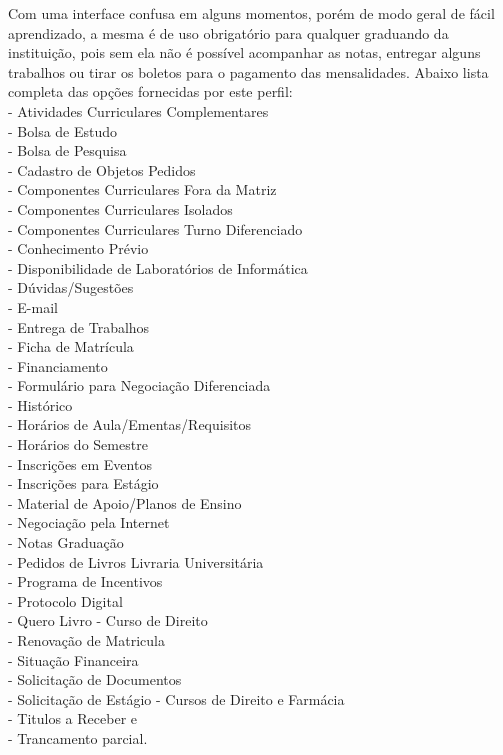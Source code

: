 Com uma interface confusa em alguns momentos, porém de modo geral de fácil aprendizado, 
a mesma é de uso obrigatório para qualquer graduando da instituição, pois sem ela não é possível 
acompanhar as notas, entregar alguns trabalhos ou tirar os boletos para o pagamento das mensalidades. 
Abaixo lista completa das opções fornecidas por este perfil: \\
- Atividades Curriculares Complementares \\
- Bolsa de Estudo \\
- Bolsa de Pesquisa \\
- Cadastro de Objetos Pedidos \\
- Componentes Curriculares Fora da Matriz \\
- Componentes Curriculares Isolados \\
- Componentes Curriculares Turno Diferenciado \\
- Conhecimento Prévio \\
- Disponibilidade de Laboratórios de Informática \\
- Dúvidas/Sugestões \\
- E-mail \\
- Entrega de Trabalhos \\
- Ficha de Matrícula \\
- Financiamento \\
- Formulário para Negociação Diferenciada \\
- Histórico \\
- Horários de Aula/Ementas/Requisitos \\
- Horários do Semestre \\
- Inscrições em Eventos \\
- Inscrições para Estágio \\
- Material de Apoio/Planos de Ensino \\
- Negociação pela Internet \\
- Notas Graduação \\
- Pedidos de Livros Livraria Universitária \\
- Programa de Incentivos \\
- Protocolo Digital \\
- Quero Livro - Curso de Direito \\
- Renovação de Matricula \\
- Situação Financeira \\
- Solicitação de Documentos \\
- Solicitação de Estágio - Cursos de Direito e Farmácia \\
- Titulos a Receber e \\
- Trancamento parcial. \\

